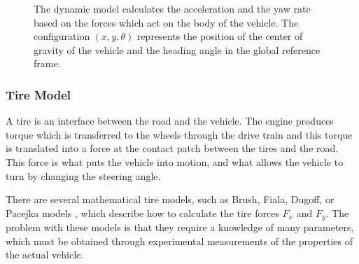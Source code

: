 \begin{figure}[p]
	
	\caption{The dynamic model calculates the acceleration and the yaw rate based on the forces which act on the body of the vehicle. The configuration $(x, y, \theta)$ represents the position of the center of gravity of the vehicle and the heading angle in the global reference frame.}
	\label{fig:dynamic_bicycle}
\end{figure}

\subsubsection{Tire Model}

A tire is an interface between the road and the vehicle. The engine produces torque which is transferred to the wheels through the drive train and this torque is translated into a force at the contact patch between the tires and the road. This force is what puts the vehicle into motion, and what allows the vehicle to turn by changing the steering angle. 

There are several mathematical tire models, such as Brush, Fiala, Dugoff, or Pacejka models \cite{rajamani, pacejka}, which describe how to calculate the tire forces $F_x$ and $F_y$. The problem with these models is that they require a knowledge of many parameters, which must be obtained through experimental measurements of the properties of the actual vehicle.

